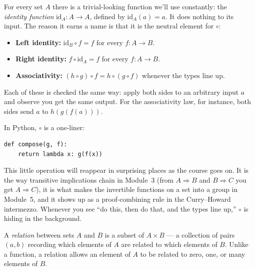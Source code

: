 \documentclass[11pt]{article}
\begin{document}
\begin{center}
\end{center}

For every set $A$ there is a trivial-looking function we'll use constantly: the \emph{identity function} $\mathrm{id}_A : A \to A$, defined by $\mathrm{id}_A(a) = a$. It does nothing to its input. The reason it earns a name is that it is the neutral element for $\circ$:

\begin{itemize}
  \item \textbf{Left identity:} $\mathrm{id}_B \circ f = f$ for every $f : A \to B$.
  \item \textbf{Right identity:} $f \circ \mathrm{id}_A = f$ for every $f : A \to B$.
  \item \textbf{Associativity:} $(h \circ g) \circ f = h \circ (g \circ f)$ whenever the types line up.
\end{itemize}

Each of these is checked the same way: apply both sides to an arbitrary input $a$ and observe you get the same output. For the associativity law, for instance, both sides send $a$ to $h(g(f(a)))$.

In Python, $\circ$ is a one-liner:
\begin{lstlisting}
def compose(g, f):
    return lambda x: g(f(x))
\end{lstlisting}

This little operation will reappear in surprising places as the course goes on. It is the way transitive implications chain in Module~3 (from $A \Rightarrow B$ and $B \Rightarrow C$ you get $A \Rightarrow C$), it is what makes the invertible functions on a set into a group in Module~5, and it shows up as a proof-combining rule in the Curry--Howard intermezzo. Whenever you see ``do this, then do that, and the types line up,'' $\circ$ is hiding in the background.

\begin{definition}[Relation]
A \emph{relation} between sets $A$ and $B$ is a subset of $A \times B$ --- a collection of pairs $(a, b)$ recording which elements of $A$ are related to which elements of $B$. Unlike a function, a relation allows an element of $A$ to be related to zero, one, or many elements of $B$.
\end{definition}
\end{document}

